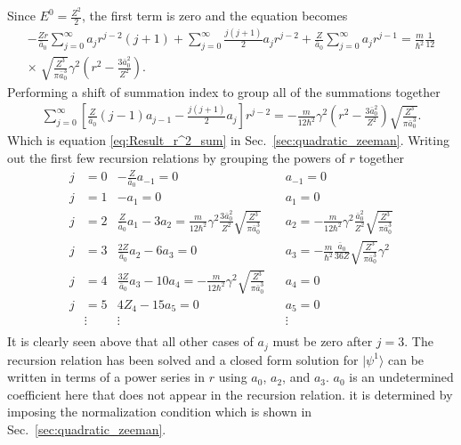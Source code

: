     \noindent Since $E^0 = \frac{Z^2}{2}$, the first term is zero and the equation becomes 
    \begin{align*}
        -\frac{Zr}{\bar{a}_0} \sum_{j = 0}^\infty a_j r^{j - 2} (j + 1) + \sum_{j = 0}^\infty \frac{j(j+1)}{2} a_j r^{j - 2} + \frac{Z}{\bar{a}_0} \sum_{j = 0}^\infty a_j r^{j-1} = \frac{m}{\hbar^2}\frac{1}{12}\\
        \times \; \sqrt{\frac{Z^3}{\pi \bar{a}_0^3}} \gamma^2 \left(r^2 - \frac{3\bar{a}_0^2}{Z^2} \right).
    \end{align*}
    \noindent Performing a shift of summation index to group all of the summations together 
    \begin{align}
        \sum_{j = 0}^\infty \left[ \frac{Z}{\bar{a}_0}(j-1) a_{j-1} - \frac{j(j+1)}{2} a_j \right] r^{j-2} = -\frac{m}{12 \hbar^2} \gamma^2 \left(r^2 - \frac{3\bar{a}_0^2}{Z^2} \right) \sqrt{\frac{Z^3}{\pi \bar{a}_0^3}}.
    \end{align}
    \noindent Which is equation \eqref{eq:Result_r^2_sum} in Sec.~\ref{sec:quadratic_zeeman}. Writing out the first few recursion relations by grouping the powers of $r$ together 
    \begin{align*}
        j &= 0 & -\frac{Z}{\bar{a}_0}a_{-1} = 0& &a_{-1} = 0\\ \nonumber
        j &= 1 & -a_1 = 0& &a_{1} = 0\\ \nonumber
        j &= 2 & \frac{Z}{\bar{a}_0} a_1 - 3a_2 = \frac{m}{12 \hbar^2} \gamma^2 \frac{3\bar{a}_0^2}{Z^2}\sqrt{\frac{Z^3}{\pi \bar{a}_0^3}} & &a_2 = -\frac{m}{12 \hbar^2} \gamma^2 \frac{\bar{a}_0^2}{Z^2}\sqrt{\frac{Z^3}{\pi \bar{a}_0^3}}\\ \nonumber
        j &= 3 & \frac{2Z}{\bar{a}_0}a_2 - 6a_3 = 0&& a_3 = -\frac{m}{\hbar^2}\frac{\bar{a}_0}{36Z}\sqrt{\frac{Z^3}{\pi \bar{a}_0^3}} \gamma^2\\ \nonumber
        j &= 4 & \frac{3Z}{\bar{a}_0}a_3 - 10a_4 = -\frac{m}{12 \hbar^2} \gamma^2 \sqrt{\frac{Z^3}{\pi \bar{a}_0^3}} && a_4 = 0\\ \nonumber
        j &= 5 & 4Z_4 - 15a_5 = 0 && a_5 = 0 \\ \nonumber
        & \vdots & \vdots && \vdots \\
    \end{align*}
    \noindent It is clearly seen above that all other cases of $a_j$ must be zero after $j = 3$. The recursion relation has been solved and a closed form solution for $\vert \psi^1 \rangle$ can be written in terms of a power series in $r$ using $a_0$, $a_2$, and $a_3$. $a_0$ is an undetermined coefficient here that does not appear in the recursion relation. it is determined by imposing the normalization condition which is shown in Sec.~\ref{sec:quadratic_zeeman}.\\

